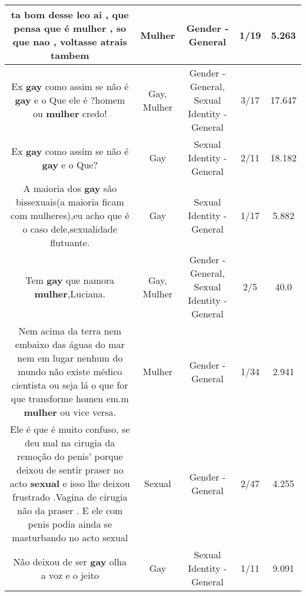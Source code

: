 \documentclass[11pt]{article}
\newlength\mylength
\begin{document}
\begin{center}
\begin{longtable}{|C{.65\mylength}|C{.30\mylength}|C{.12\mylength}|C{.12\mylength}|C{.12\mylength}|}
  \small ta bom desse leo ai , que pensa que é \textbf{mulher} , so que nao , voltasse atrais tambem\normalsize   & Mulher & Gender - General & 1/19 & 5.263 \\  \hline
  \small Ex \textbf{gay} como assim se não é \textbf{gay} e o Que ele é ?homem ou \textbf{mulher} credo!\normalsize   & Gay, Mulher & Gender - General, Sexual Identity - General & 3/17 & 17.647 \\  \hline
  \small Ex \textbf{gay} como assim se não é \textbf{gay} e o Que?\normalsize   & Gay & Sexual Identity - General & 2/11 & 18.182 \\  \hline
  \small A maioria dos \textbf{gay} são bissexuais(a maioria ficam com mulheres),eu acho que é o caso dele,sexualidade flutuante.\normalsize   & Gay & Sexual Identity - General & 1/17 & 5.882 \\  \hline
  \small Tem \textbf{gay} que namora \textbf{mulher},Luciana.\normalsize   & Gay, Mulher & Gender - General, Sexual Identity - General & 2/5 & 40.0 \\  \hline
  \small Nem acima da terra nem embaixo das águas do mar nem em lugar nenhum do mundo não existe médico cientista ou seja lá o que for que transforme homen  em.m \textbf{mulher} ou vice versa.\normalsize   & Mulher & Gender - General & 1/34 & 2.941 \\  \hline
  \small Ele é que é muito confuso, se deu mal na cirugia da remoção do penis' porque deixou de sentir praser no acto \textbf{sexual} e isso lhe deixou frustrado .Vagina de cirugia não da praser  . E ele com penis podia ainda se masturbando no acto sexual\normalsize   & Sexual & Gender - General & 2/47 & 4.255 \\  \hline
  \small Não deixou de ser \textbf{gay} olha a voz e o jeito\normalsize   & Gay & Sexual Identity - General & 1/11 & 9.091 \\  \hline

\end{longtable}
\end{center}
\end{document}
